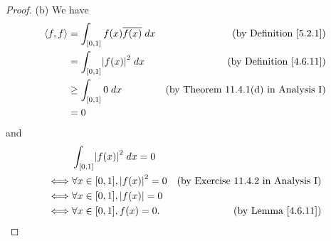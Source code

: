 \begin{proof}{(b)}
    We have
    \begin{align*}
        \inner*{f, f} & = \int_{[0, 1]} f(x) \overline{f(x)} \; dx & \text{(by Definition \ref{5.2.1})}          \\
                      & = \int_{[0, 1]} \abs{f(x)}^2 \; dx         & \text{(by Definition \ref{4.6.11})}         \\
                      & \geq \int_{[0, 1]} 0 \; dx                 & \text{(by Theorem 11.4.1(d) in Analysis I)} \\
                      & = 0
    \end{align*}
    and
    \begin{align*}
             & \int_{[0, 1]} \abs{f(x)}^2 \; dx = 0                                               \\
        \iff & \forall x \in [0, 1], \abs{f(x)}^2 = 0 & \text{(by Exercise 11.4.2 in Analysis I)} \\
        \iff & \forall x \in [0, 1], \abs{f(x)} = 0                                               \\
        \iff & \forall x \in [0, 1], f(x) = 0.        & \text{(by Lemma \ref{4.6.11})}
    \end{align*}
\end{proof}

